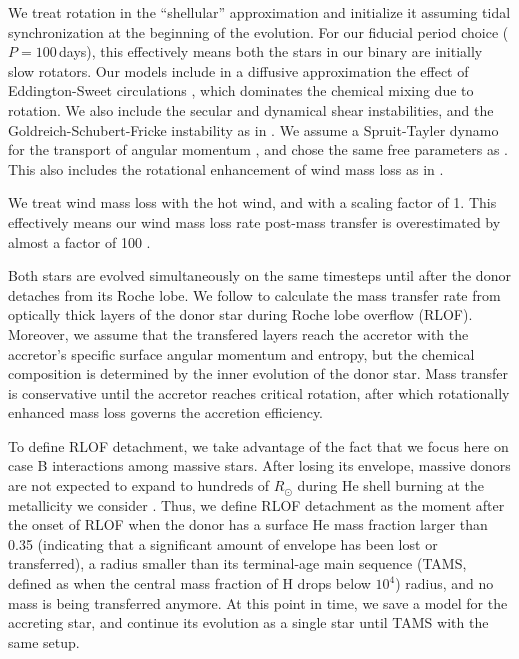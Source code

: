 \documentclass[twocolumn,twocolappendix,trackchanges]{aastex63}
\begin{document}
We treat rotation in the ``shellular'' approximation and initialize it
assuming tidal synchronization at the
beginning of the evolution. For our fiducial period choice ($P=100$\,days), this effectively means both the stars in our binary are
initially slow rotators. Our models include in a diffusive
approximation the effect of Eddington-Sweet circulations
\citep{sweet:50}, which dominates the chemical mixing due to
rotation. We also include the secular and dynamical shear
instabilities, and the Goldreich-Schubert-Fricke instability as in
\cite{gotberg:17, gotberg:18, laplace:20, laplace:21}.  We assume a Spruit-Tayler
dynamo for the transport of angular momentum \citep{spruit:02}, and chose the same free
parameters as \cite{heger:00}. This also includes the rotational
enhancement of wind mass loss as in \cite{langer:98}.

We treat wind mass loss with the \cite{vink:00,vink:01} hot wind,
and \cite{dejager:88} with a scaling factor of 1. This effectively
means our wind mass loss rate post-mass transfer is overestimated by
almost a factor of 100 \citep[weak wind problem, see][]{marcolino:09}.


Both stars are evolved simultaneously on the same timesteps until
after the donor detaches from its Roche lobe. We follow \cite{kolb:90}
to calculate the mass transfer rate from optically thick layers of the
donor star during Roche lobe overflow (RLOF). Moreover, we assume that
the transfered layers reach the accretor with the accretor's specific
surface angular momentum and entropy, but the chemical composition is
determined by the inner evolution of the donor star. Mass transfer is
conservative until the accretor reaches critical rotation, after which
rotationally enhanced mass loss governs the accretion efficiency.

To define RLOF detachment, we take advantage of the fact that we focus
here on case B interactions among massive stars. After losing its
envelope, massive donors are not expected to expand to hundreds of
$R_\odot$ during He shell burning at the metallicity we consider
\citep[e.g.,][]{laplace:20}. Thus, we define RLOF detachment as the moment
after the onset of RLOF when the donor has a surface He mass fraction
larger than 0.35 (indicating that a significant amount of envelope has
been lost or transferred), a radius smaller than its terminal-age main
sequence (TAMS, defined as when the central mass fraction of H drops
below $10^4$) radius, and no mass is being transferred anymore. At
this point in time, we save a model for the accreting star, and
continue its evolution as a single star until TAMS with the same
setup.
\end{document}
